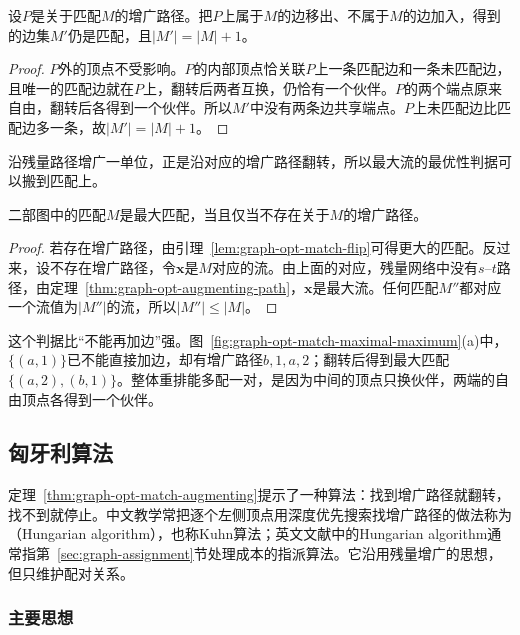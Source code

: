 \begin{lemma}[沿增广路径翻转]
\label{lem:graph-opt-match-flip}
设$P$是关于匹配$M$的增广路径。把$P$上属于$M$的边移出、不属于$M$的边加入，得到的边集$M'$仍是匹配，且$|M'|=|M|+1$。
\end{lemma}

\begin{proof}
$P$外的顶点不受影响。$P$的内部顶点恰关联$P$上一条匹配边和一条未匹配边，且唯一的匹配边就在$P$上，翻转后两者互换，仍恰有一个伙伴。$P$的两个端点原来自由，翻转后各得到一个伙伴。所以$M'$中没有两条边共享端点。$P$上未匹配边比匹配边多一条，故$|M'|=|M|+1$。
\end{proof}

沿残量路径增广一单位，正是沿对应的增广路径翻转，所以最大流的最优性判据可以搬到匹配上。

\begin{theorem}[增广路径判据]
\label{thm:graph-opt-match-augmenting}
二部图中的匹配$M$是最大匹配，当且仅当不存在关于$M$的增广路径。
\end{theorem}

\begin{proof}
若存在增广路径，由引理~\ref{lem:graph-opt-match-flip}可得更大的匹配。反过来，设不存在增广路径，令$\bm x$是$M$对应的流。由上面的对应，残量网络中没有$s$--$t$路径，由定理~\ref{thm:graph-opt-augmenting-path}，$\bm x$是最大流。任何匹配$M''$都对应一个流值为$|M''|$的流，所以$|M''|\leq|M|$。
\end{proof}

这个判据比“不能再加边”强。图~\ref{fig:graph-opt-match-maximal-maximum}(a)中，$\{(a,1)\}$已不能直接加边，却有增广路径$b,1,a,2$；翻转后得到最大匹配$\{(a,2),(b,1)\}$。整体重排能多配一对，是因为中间的顶点只换伙伴，两端的自由顶点各得到一个伙伴。

\subsection{匈牙利算法}
\label{sec:graph-opt-match-algorithm}

定理~\ref{thm:graph-opt-match-augmenting}提示了一种算法：找到增广路径就翻转，找不到就停止。中文教学常把逐个左侧顶点用深度优先搜索找增广路径的做法称为（Hungarian algorithm），也称Kuhn算法；英文文献中的Hungarian algorithm通常指第~\ref{sec:graph-assignment}节处理成本的指派算法。它沿用残量增广的思想，但只维护配对关系。

\subsubsection{主要思想}

